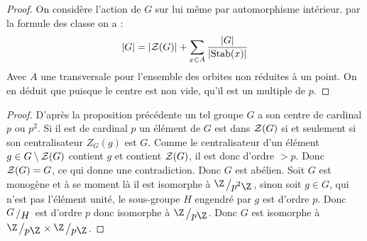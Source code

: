 
\begin{proof} On considère l'action de $G$ sur lui même par automorphisme intérieur. par la formule des classe on a :
\[\vert G \vert = \vert \mathcal{Z}(G) \vert + \sum_{x\in A} \frac{\vert G \vert}{\vert \textup{Stab}(x) \vert }\]
Avec $A$ une transversale pour l'ensemble des orbites non réduites à un point. On en déduit que puisque le centre est non vide, qu'il est un multiple de $p$.
\end{proof}



\begin{proof} D'après la proposition précédente un tel groupe $G$ a son centre de cardinal $p$ ou $p^2$. Si il est de cardinal $p$ un élément de $G$ est dans $\mathcal{Z}(G)$ si et seulement si son centralisateur $Z_G(g)$ est $G$. Comme le centralisateur d'un élément $g \in G\setminus \mathcal{Z}(G)$ contient $g$ et contient $\mathcal{Z}(G)$, il est donc d'ordre $>p$. Donc $\mathcal{Z}(G)= G$, ce qui donne une contradiction. Donc $G$ est abélien. Soit $G$ est monogène et à se moment là il est isomorphe à $\bigslant{\Z}{p^2\Z}$, sinon soit $g \in G$, qui n'est pas l'élément unité, le sous-groupe $H$ engendré par $g$ est d'ordre $p$. Donc $\bigslant{G}{H}$ est d'ordre $p$ donc isomorphe à $\bigslant{\Z}{p\Z}$. Donc $G$ est isomorphe à $\bigslant{\Z}{p\Z} \times \bigslant{\Z}{p\Z}$.
\end{proof}
